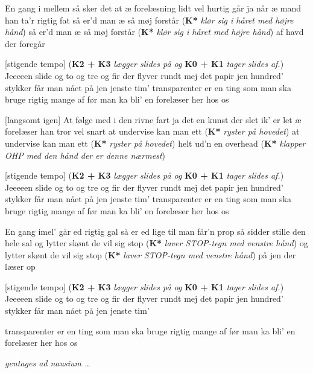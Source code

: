 \documentclass[a4paper,11pt]{article}
\begin{document}
\begin{song}
  
   En gang i mellem så sker det at
  æ forelæsning lidt vel hurtig går
  ja når æ mand han ta'r rigtig fat
  så er'd man æ så møj forstår
  ({\bf K*} {\it klør sig i håret med højre hånd})
  så er'd man æ så møj forstår
  ({\bf K*} {\it klør sig i håret med højre hånd})
  af havd der foregår
  
  [stigende tempo] 
  ({\bf K2 + K3} {\it lægger slides på og} {\bf K0 + K1} {\it tager slides af.})
  Jeeeeen slide og to og tre og fir
  der flyver rundt mej det papir
  jen hundred' stykker får man nået på jen jenste tim'
  transparenter er en ting som man ska bruge rigtig mange af før man ka bli'
  en forelæser her hos os
  
  [langsomt igen] At følge med i den rivne fart
  ja det en kunst der slet ik' er let
  æ forelæser han tror vel snart
  at undervise kan man ett
  ({\bf K*} {\it ryster på hovedet})
  at undervise kan man ett
  ({\bf K*} {\it ryster på hovedet})
  helt ud'n en overhead
  ({\bf K*} {\it klapper OHP med den hånd der er denne nærmest})
  
  [stigende tempo]
  ({\bf K2 + K3} {\it lægger slides på og} {\bf K0 + K1} {\it tager slides af.})
  Jeeeeen slide og to og tre og fir
  der flyver rundt mej det papir
  jen hundred' stykker får man nået på jen jenste tim'
  transparenter er en ting som man ska bruge rigtig mange af før man ka bli'
  en forelæser her hos os
  
   En gang imel' går ed rigtig gal
  så er ed lige til man får'n prop
  så sidder stille den hele sal
  og lytter skønt de vil sig stop
  ({\bf K*} {\it laver STOP-tegn med venstre hånd})
  og lytter skønt de vil sig stop
  ({\bf K*} {\it laver STOP-tegn med venstre hånd})
  på jen der læser op
  
  [stigende tempo]
  ({\bf K2 + K3} {\it lægger slides på og} {\bf K0 + K1} {\it tager slides af.})
  Jeeeeen slide og to og tre og fir
  der flyver rundt mej det papir
  jen hundred' stykker får man nået på jen jenste tim'
  

  transparenter er en ting som man ska bruge rigtig mange af før man ka bli'
  en forelæser her hos os

  {\it gentages ad nausium \ldots}
\end{song}
\end{document}
